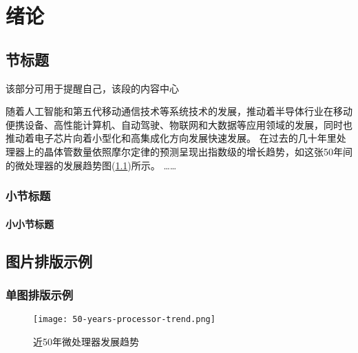     
\chapter{绪论}\label{ch:1}
\section{节标题}

\begin{shaded}
    该部分可用于提醒自己，该段的内容中心  
    \end{shaded}

    随着人工智能和第五代移动通信技术等系统技术的发展\cite{Lau_2022}，推动着半导体行业在移动便携设备、高性能计算机、自动驾驶、物联网和大数据等应用领域的发展\cite{Lau_2022}，同时也推动着电子芯片向着小型化和高集成化方向发展快速发展\cite{Sadique.Murtaza.ea_2022}。
在过去的几十年里处理器上的晶体管数量依照摩尔定律\cite{Tan.Du.ea_2021}的预测呈现出指数级的增长趋势，如这张50年间的微处理器的发展趋势图(\cref{fig:processor-trend})所示。
……

\subsection{小节标题}
\subsubsection{小小节标题}

\section{图片排版示例}
\subsection{单图排版示例}

\begin{figure}[htb]
    \texttt{[image: 50-years-processor-trend.png]}
    \caption{近50年微处理器发展趋势}
    \label{fig:processor-trend}
\end{figure}


